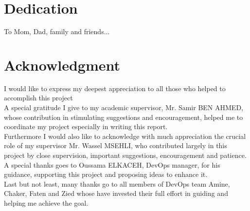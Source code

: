 \chapter*{Dedication}
\vspace*{2cm}
\begin{center}
To Mom, Dad, family and friends...
\end{center}

\chapter*{Acknowledgment}
I would like to express my deepest appreciation to all those who helped to
accomplish this project
\\

A special gratitude I give to my academic supervisor, Mr. Samir BEN AHMED,
whose contribution in stimulating suggestions and encouragement, helped me to
coordinate my project especially in writing this report.
\\

Furthermore I would also like to acknowledge with much appreciation the crucial
role of my supervisor Mr. Wassel MSEHLI, who contributed largely in this
project by close supervision, important suggestions, encouragement and
patience.
\\

A special thanks goes to Oussama ELKACEH, DevOps manager, for his guidance,
supporting this project and proposing ideas to enhance it.
\\

Last but not least, many thanks go to all members of DevOps team Amine, Chaker, Faten
and Zied whose have invested their full effort in guiding and helping me achieve
the goal.
